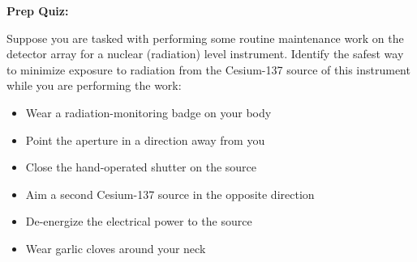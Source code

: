 \vfil \eject

\noindent
{\bf Prep Quiz:}

Suppose you are tasked with performing some routine maintenance work on the detector array for a nuclear (radiation) level instrument.  Identify the safest way to minimize exposure to radiation from the Cesium-137 source of this instrument while you are performing the work:

\begin{itemize}
\item{} Wear a radiation-monitoring badge on your body
\vskip 5pt 
\item{} Point the aperture in a direction away from you
\vskip 5pt 
\item{} Close the hand-operated shutter on the source
\vskip 5pt 
\item{} Aim a second Cesium-137 source in the opposite direction
\vskip 5pt 
\item{} De-energize the electrical power to the source
\vskip 5pt 
\item{} Wear garlic cloves around your neck
\end{itemize}




